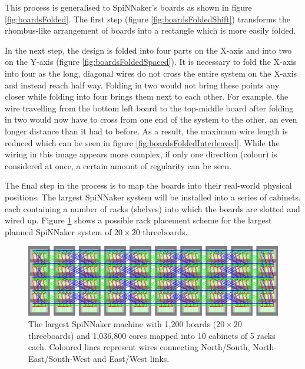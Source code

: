 			This process is generalised to SpiNNaker's boards as shown in figure
			\ref{fig:boardsFolded}. The first step (figure
			\ref{fig:boardsFoldedShift}) transforms the rhombus-like arrangement of
			boards into a rectangle which is more easily folded.
			
			In the next step, the design is folded into four parts on the X-axis and
			into two on the Y-axis (figure \ref{fig:boardsFoldedSpaced}). It is
			necessary to fold the X-axis into four as the long, diagonal wires do not
			cross the entire system on the X-axis and instead reach half way. Folding
			in two would not bring these points any closer while folding into four
			brings them next to each other. For example, the wire travelling from the
			bottom left board to the top-middle board after folding in two would now
			have to cross from one end of the system to the other, an even longer
			distance than it had to before. As a result, the maximum wire length is
			reduced which can be seen in figure \ref{fig:boardsFoldedInterleaved}.
			While the wiring in this image appears more complex, if only one direction
			(colour) is considered at once, a certain amount of regularity can be
			seen.
			
			\label{sec:mapping-spinnaker-to-cabinets}
			
			The final step in the process is to map the boards into their real-world
			physical positions. The largest SpiNNaker system will be installed into a
			series of cabinets, each containing a number of racks (shelves) into which
			the boards are slotted and wired up. Figure \ref{fig:spinnaker106} shows a
			possible rack placement scheme for the largest planned SpiNNaker system of
			$20\times20$ threeboards.
			
			\begin{figure}
				\center
				\includegraphics[width=\textwidth]{figures/spinnaker106}
				\caption[SpiNNaker machine mapped into cabinets and racks.]{The largest
				SpiNNaker machine with 1,200 boards ($20\times20$ threeboards) and
				1,036,800 cores mapped into 10 cabinets of 5 racks each.  Coloured lines
				represent wires connecting {\color{red}North/South},
				{\color{green}North-East/South-West} and {\color{blue}East/West} links.}
				\label{fig:spinnaker106}
			\end{figure}
			
